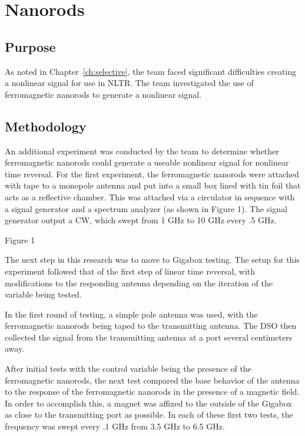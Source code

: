 \chapter{Nanorods}

\label{ch:nanorod}

\section{Purpose}

As noted in Chapter~\ref{ch:selective}, the team faced significant difficulties creating a nonlinear signal for use in NLTR.  The team investigated the use of ferromagnetic nanorods to generate a nonlinear signal.

\section{Methodology}
\label{sec:nanorod-meth}

An additional experiment was conducted by the team to determine whether ferromagnetic nanorods could generate a useable nonlinear signal for nonlinear time reversal. For the first experiment, the ferromagnetic nanorods were attached with tape to a monopole antenna and put into a small box lined with tin foil that acts as a reflective chamber. This was attached via a circulator in sequence with a signal generator and a spectrum analyzer (as shown in Figure 1). The signal generator output a CW, which swept from 1 GHz to 10 GHz every .5 GHz.



                  Figure 1

The next step in this research was to move to Gigabox testing. The setup for this experiment followed that of the first step of linear time reversal, with modifications to the responding antenna depending on the iteration of the variable being tested.

In the first round of testing, a simple pole antenna was used, with the ferromagnetic nanorods being taped to the transmitting antenna. The DSO then collected the signal from the transmitting antenna at a port several centimeters away.

After initial tests with the control variable being the presence of the ferromagnetic nanorods, the next test compared the base behavior of the antenna to the response of the ferromagnetic nanorods in the presence of a magnetic field. In order to accomplish this, a magnet was affixed to the outside of the Gigabox as close to the transmitting port as possible. In each of these first two tests, the frequency was swept every .1 GHz from 3.5 GHz to 6.5 GHz.

